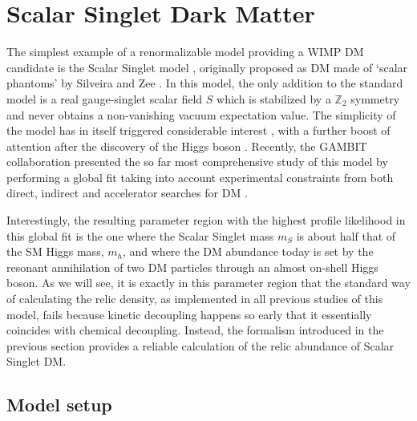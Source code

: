 \documentclass[twocolumn,showpacs,amsmath,amssymb,superscriptaddress,nofootinbib]{revtex4-1}
\begin{document}
\section{Scalar Singlet Dark Matter}
\label{sec:singlet}

The simplest example of a renormalizable model providing a WIMP DM candidate is 
the Scalar Singlet model \cite{Silveira:1985rk,McDonald:1993ex,Burgess:2000yq},
originally proposed as DM made of `scalar phantoms' by Silveira and Zee \cite{Silveira:1985rk}.
In this model, the only addition to the standard model is a real gauge-singlet scalar field $S$
which is stabilized by a $\mathbb{Z}_2$ symmetry and never obtains a non-vanishing vacuum 
expectation value. The simplicity of the model has in itself triggered considerable interest  
\cite{Yaguna:2008hd,Profumo:2010kp,Arina:2010rb,Mambrini:2011ik,Lerner:2009xg,Herranen:2015ima,Kahlhoefer:2015jma,Profumo:2007wc,Barger:2008jx,Cline:2012hg}, with a further boost of attention after the discovery of the Higgs boson \cite{Djouadi:2011aa,Cheung:2012xb,Endo:2014cca,Djouadi:2012zc,Cline:2013gha,Urbano:2014hda,He:2016mls,Escudero:2016gzx,Goudelis:2009zz,Craig:2014lda,Han:2016gyy,Ko:2016xwd,Beniwal:2015sdl,Cuoco:2016jqt}. 
Recently, the GAMBIT \cite{Athron:2017ard} collaboration presented the so far most comprehensive 
study of this model by performing a global fit taking into account experimental constraints from 
both direct, indirect and accelerator searches for DM \cite{Athron:2017kgt}. 

Interestingly, the resulting parameter region with the highest profile likelihood in this global fit is the one where
the Scalar Singlet mass $m_S$ is about half that of the SM Higgs mass, $m_h$, and where the DM 
abundance today is set by the resonant annihilation of two DM particles through an almost on-shell 
Higgs boson. As we will see, it is exactly in this parameter region that the standard way of 
calculating the relic density, as implemented in all previous studies of this model, fails because
kinetic decoupling happens so early that it essentially coincides with chemical decoupling.
Instead, the formalism introduced in the previous section provides a reliable calculation of
the relic abundance of Scalar Singlet DM.


\subsection{Model setup}
\end{document}
